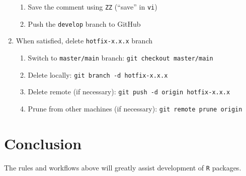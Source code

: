 \documentclass{article}
\begin{document}
\begin{enumerate}
\begin{enumerate}
	\item Save the comment using \texttt{ZZ} (``save'' in \texttt{vi})

	\item Push the \texttt{develop} branch to GitHub

  \end{enumerate}
  \item When satisfied, delete \texttt{hotfix-x.x.x} branch
  \begin{enumerate}

    \item Switch to \texttt{master/main} branch: \texttt{git checkout master/main}

    \item Delete locally: \texttt{git branch -d hotfix-x.x.x}

    \item Delete remote (if necessary): \texttt{git push -d origin hotfix-x.x.x}

	\item Prune from other machines (if necessary): \texttt{git remote prune origin}

  \end{enumerate}


\end{enumerate}


\section{Conclusion}
\label{sec:conclusion}

The rules and workflows above will greatly assist
development of \texttt{R} packages.








\end{document}
